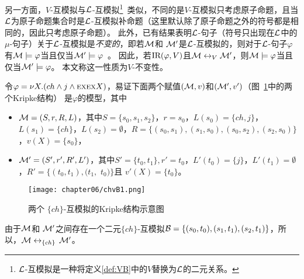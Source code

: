另一方面，$V$-互模拟与${\cal L}$-互模拟\footnote{${\cal L}$-互模拟是一种将定义\ref{def:VB}中的$V$替换为${\cal L}$的二元关系。}~\cite{d1996uniform}类似，不同的是$V$-互模拟只考虑原子命题，且当${\cal L}$为原子命题集合时是${\cal L}$-互模拟补命题（这里默认除了原子命题之外的符号都是相同的，因此只考虑原子命题）。
此外，已有结果表明${\cal L}$-句子（符号只出现在${\cal L}$中的$\mu$-句子）关于${\cal L}$-互模拟是{\em 不变的}，即若${\cal M}$和 ${\cal M}'$是${\cal L}$-互模拟的，则对于${\cal L}$-句子$\varphi$有${\cal M} \models \varphi$当且仅当${\cal M}' \models \varphi$~\cite{d1996uniform,bradfield2018mu}。
因此，若$\textrm{IR}(\varphi, V)$且${\cal M} \leftrightarrow_V {\cal M}'$，则${\cal M} \models \varphi$当且仅当${\cal M}' \models \varphi$。
本文称这一性质为$V$-不变性。
\begin{example}\label{exmp:c06:bisim}
	 令$\varphi= \nu X.( ch \wedge j \wedge  \textsc{e} \textsc{x} \textsc{e} \textsc{x} X)$，易证下面两个赋值$({\cal M},v)$和$({\cal M}',v')$（图~\ref{chapter06:fig:bisim}中的两个Kripke结构）
	 是$\varphi$的模型，其中
	\begin{itemize}
		\item ${\cal M}=(S,r,R,L)$，其中$S=\{s_0,s_1,s_2\}$，$r=s_0$，$L(s_0)=\{ch, j\}$，$L(s_1)=\{ch\}$，$L(s_2)=\emptyset$，$R=\{(s_0,s_1), (s_1,s_0), (s_0,s_2), (s_2,s_0)\}$，$v(X)=\{s_0\}$，
		\item  ${\cal M}'=(S',r',R',L')$，其中$S'=\{t_0,t_1\}, r'=t_0$，$L'(t_0)=\{j\}$，$L'(t_1)=\emptyset$，$R'=\{(t_0,t_1), (t_1,$ $t_0)\}$且
		$v'(X)=\{t_0\}$。
	\end{itemize} 
	
		\begin{figure}[h]%
		\centering
		\texttt{[image: chapter06/chvB1.png]}
		\caption{两个 $\{ch\}$-互模拟的Kripke结构示意图}\label{chapter06:fig:bisim}
		
	\end{figure}
	
	由于${\cal M}$和 ${\cal M}'$之间存在一个二元$\{ch\}$-互模拟${\cal B}=\{(s_0, t_0), (s_1, t_1), (s_2, t_1)\}$，所以，${\cal M} \leftrightarrow_{\{ch\}}$ ${\cal M}'$。
\end{example}

